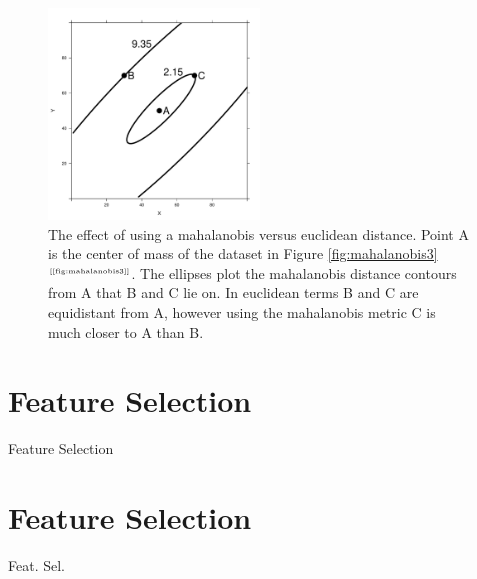 \documentclass[xcolor={table}]{beamer}
\newcommand{\SectionSlideShortHeader}[3][]{
	\ifthenelse{\isempty{#1}}
		{\section[#3]{#2}\begin{frame} \begin{center}\begin{huge}#2\end{huge}\end{center}\end{frame}}
		{\section[#1]{#2}\begin{frame} \begin{center}\begin{huge}#3\end{huge}\end{center}\end{frame}}
}
\newcommand{\ourRef}[1]{\ref{#1} $^{\text{\tiny[\pageref{#1}]}}$}
\begin{document}
 \begin{frame} 
\begin{figure}[htb]
       \begin{centering}
       \includegraphics[width=0.5\textwidth]{images/mahalanobis_7.pdf}
       \caption{The effect of using a mahalanobis versus euclidean distance. Point A is the center of mass of the dataset in Figure \ourRef{fig:mahalanobis3}. The ellipses plot the mahalanobis distance contours from A that B and C lie on. In euclidean terms B and C are equidistant from A, however using the mahalanobis metric C is much closer to A than B.}
       \label{fig:mahalanobis_euclidean}
       \end{centering}
\end{figure}
\end{frame} 

\SectionSlideShortHeader{Feature Selection}{Feat. Sel.}
\end{document}
